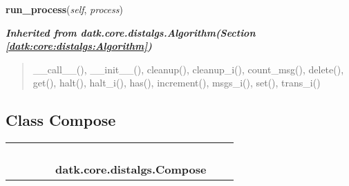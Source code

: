     \label{datk:core:distalgs:Asynchronous_Algorithm:run_process}

    \vspace{0.5ex}

\hspace{.8\funcindent}\begin{boxedminipage}{\funcwidth}

    \raggedright \textbf{run\_process}(\textit{self}, \textit{process})

\setlength{\parskip}{2ex}
\setlength{\parskip}{1ex}
    \end{boxedminipage}


\large{\textbf{\textit{Inherited from datk.core.distalgs.Algorithm\textit{(Section \ref{datk:core:distalgs:Algorithm})}}}}

\begin{quote}
\_\_call\_\_(), \_\_init\_\_(), cleanup(), cleanup\_i(), count\_msg(), delete(), get(), halt(), halt\_i(), has(), increment(), msgs\_i(), set(), trans\_i()
\end{quote}


\subsection{Class Compose}

    \label{datk:core:distalgs:Compose}
\begin{tabular}{cccccccc}
\multicolumn{2}{r}{\settowidth{\BCL}{datk.core.distalgs.Algorithm}\multirow{2}{\BCL}{datk.core.distalgs.Algorithm}}
&&
&&
  \\\cline{3-3}
  &&\multicolumn{1}{c|}{}
&&
&&
  \\
\multicolumn{4}{r}{\settowidth{\BCL}{datk.core.distalgs.Synchronous\_Algorithm}\multirow{2}{\BCL}{datk.core.distalgs.Synchronous\_Algorithm}}
&&
  \\\cline{5-5}
  &&&&\multicolumn{1}{c|}{}
&&
  \\
&&&&\multicolumn{2}{l}{\textbf{datk.core.distalgs.Compose}}
\end{tabular}


